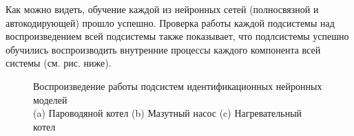Как можно видеть, обучение каждой из нейронных сетей (полносвязной и
автокодирующей) прошло успешно. Проверка работы каждой подсистемы над
воспроизведением всей подсистемы также показывает, что подлсистемы успешно
обучились воспроизводить внутренние процессы каждого компонента всей системы
(см. рис. ниже).

\begin{figure}[H]
  \centering
  \caption{Воспроизведение работы подсистем идентификационных нейронных
  моделей\\(a) Пароводяной котел (b) Мазутный насос (c) Нагревательный
  котел}\label{fig:test:plot:subsystems}
\end{figure}

